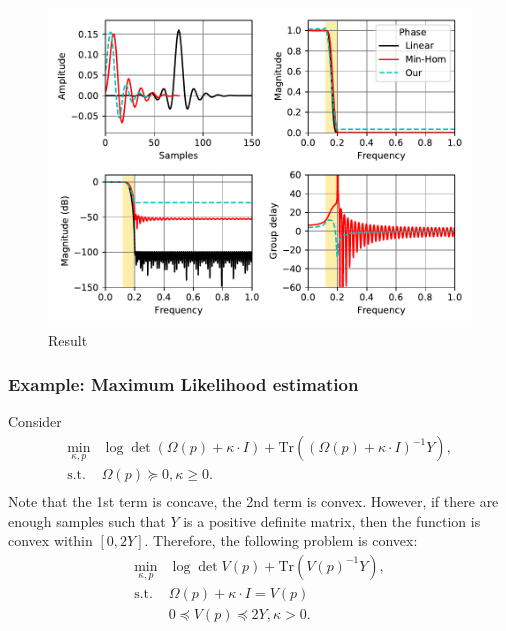 \documentclass[final,leqno]{siamltex}
\begin{document}
\begin{figure}
\hypertarget{fig:lowpass}{%
\centering
\includegraphics{ellipsoid.files/lowpass.pdf}
\caption{Result}\label{fig:lowpass}
}
\end{figure}

\hypertarget{sec:example-maximum-likelihood-estimation}{%
\subsubsection{Example: Maximum Likelihood estimation}\label{sec:example-maximum-likelihood-estimation}}

Consider
\[\begin{array}{ll}
    \min_{\kappa, p}  & \log\det(\Omega(p) + \kappa\cdot I) +
                \mathrm{Tr}((\Omega(p) + \kappa\cdot I)^{-1}Y), \\
    \text{s.t.}       & \Omega(p) \succeq 0, \kappa \geq 0 . \\
  \end{array}
\]
Note that the 1st term is concave, the 2nd term is convex. However, if there are enough samples such that \(Y\) is a positive definite matrix, then the function is convex within \([0, 2Y]\).
Therefore, the following problem is convex:
\[\begin{array}{ll}
    \min_{\kappa, p}  & \log\det V(p) + \mathrm{Tr}(V(p)^{-1}Y),\\
    \text{s.t.}       & \Omega(p) + \kappa \cdot I = V(p) \\
                      & 0 \preceq V(p) \preceq 2Y, \kappa {>} 0.
  \end{array}
\]
\end{document}
